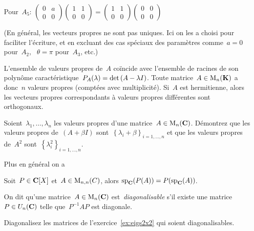 {	Pour~$A_5$: \(
		\begin{pmatrix} 0 & a \\ 0 & 0 \end{pmatrix}
		\begin{pmatrix} 1 & 1 \\ 0 & 0 \end{pmatrix}
		=
		\begin{pmatrix} 1 & 1 \\ 0 & 0 \end{pmatrix}
		\begin{pmatrix} 0 & 0 \\ 0 & 0 \end{pmatrix}
	\)

	(En général, les vecteurs propres ne sont pas uniques.  Ici on les a choisi
	pour faciliter l'écriture, et en excluant des cas spéciaux des
	paramètres comme~$a=0$ pour~$A_2$, ~$\theta=\pi$ pour~$A_3$, etc.)
}

\begin{proposition}
	\label{prp:eigenalgebra}
	L'ensemble de valeurs propres de~$A$ coïncide avec l'ensemble de racines de
	son polynôme caractéristique~$P_A(\lambda)=\mathrm{det}\left(A-\lambda
	I\right)$.  Toute matrice~$A\in\mathrm{M}_n(\mathbf{K})$ a donc~$n$ valeurs propres (comptées
	avec multiplicité).  Si~$A$ est hermitienne, alors les vecteurs propres
	correspondants à valeurs propres différentes sont orthogonaux.
\end{proposition}

\begin{exercice}
	Soient~$\lambda_1,\ldots,\lambda_n$ les valeurs propres d'une
	matrice~$A\in\mathrm{M}_n(\mathbf{C})$.  Démontrez que les valeurs propres de~$(A+\beta I)$
	sont~$\left\{\lambda_i+\beta\right\}_{i=1,\ldots,n}$ et que les valeurs
	propres de~$A^2$ sont~$\left\{\lambda_i^2\right\}_{i=1,\ldots,n}$.
\end{exercice}

Plus en général on a
\begin{proposition}
	Soit~$P\in\mathbf{C}[X]$ et~$A\in\mathrm{M}_{n,n}(C)$, alors
	$\displaystyle \mathrm{sp}_{\mathbf{C}}(P(A))=P(\mathrm{sp}_{\mathbf{C}}(A))$.
\end{proposition}

On dit qu'une matrice~$A\in\mathrm{M}_n(\mathbf{C})$ est~\emph{diagonalisable} s'il existe
une matrice~$P\in U_n(\mathbf{C})$ telle que~$P^{-1}AP$ est diagonale.

\begin{exercice}
	Diagonalisez les matrices de l'exercice~\ref{ex:eigs2x2} qui soient
	diagonalisables.
\end{exercice}

